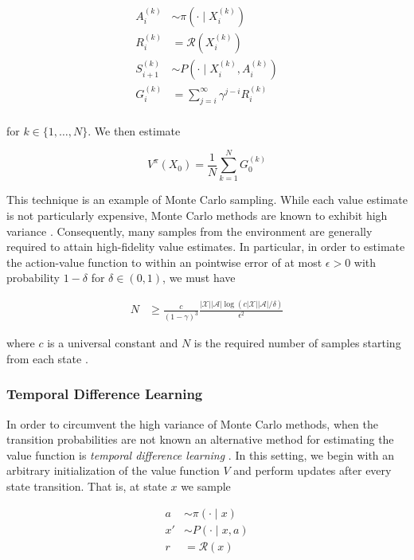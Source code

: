 \begin{equation*}
  \begin{aligned}
    A_i^{(k)} &\sim\pi(\cdot\mid X_i^{(k)})\\
    R_i^{(k)}&= \mathcal{R}(X_i^{(k)})\\
    S_{i+1}^{(k)} &\sim P(\cdot\mid X_i^{(k)}, A_i^{(k)})\\
    G_i^{(k)} &= \sum_{j=i}^\infty\gamma^{j-i}R_i^{(k)}\\
  \end{aligned}
\end{equation*}

for $k\in\{1,\dots,N\}$. We then estimate

\begin{equation*}
  V^\pi(X_0) = \frac{1}{N}\sum_{k=1}^NG_0^{(k)}
\end{equation*}

This technique is an example of Monte Carlo sampling. While each value
estimate is not particularly expensive, Monte Carlo methods are known
to exhibit high variance \citep{sutton2018reinforcement}. Consequently, many
samples from the environment are generally required to attain high-fidelity
value estimates. In particular, in order to estimate the action-value function
to within an pointwise error of at most $\epsilon>0$ with probability $1 -
\delta$ for $\delta\in(0,1)$, we must have

\begin{align*}
  N &\geq
  \frac{c}{(1-\gamma)^3}\frac{|\mathcal{X}||\mathcal{A}|\log(c|\mathcal{X}||\mathcal{A}|/\delta)}{\epsilon^2}
\end{align*}

where $c$ is a universal constant and $N$ is the required number of samples
starting from each state \citep{agarwal2019reinforcement}.

\subsubsection{Temporal Difference Learning}
In order to circumvent the high variance of Monte Carlo methods, when
the transition probabilities are not known an alternative method for
estimating the value function is \emph{temporal difference learning}
\citep{sutton1988learning}. In this setting, we begin with an arbitrary
initialization of the value function $V$ and perform updates after
every state transition. That is, at state $x$ we sample

\begin{equation*}
  \begin{aligned}
    a &\sim \pi(\cdot\mid x)\\
    x'&\sim P(\cdot\mid x, a)\\
    r &= \mathcal{R}(x)\\
  \end{aligned}
\end{equation*}

